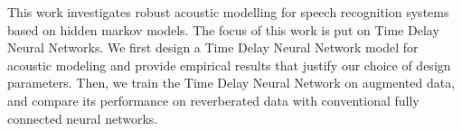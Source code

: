 
\Abstract
This work investigates robust acoustic modelling for speech recognition systems based on hidden markov models. The focus of this work is put on Time Delay Neural Networks. We first design a Time Delay Neural Network model for acoustic modeling and provide empirical results that justify our choice of design parameters. Then, we train the Time Delay Neural Network on augmented data, and compare its performance on reverberated data with conventional fully connected neural networks. 